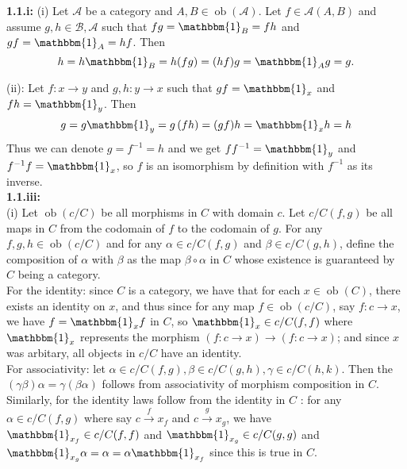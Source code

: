\documentclass[a4paper]{article}
\DeclareMathOperator{\ob}{ob}
\begin{document}
    \textbf{1.1.i:} (i) 
Let $\mathcal{A}$ be a category and $A,B \in \ob(\mathcal{A})$. Let
$f \in \mathcal{A}\left( A,B \right) $ and assume 
$g,h \in \mathcal{B,A}$ such that
$fg = \mathbbm{1}_{B} = fh$ and $gf = \mathbbm{1}_{A} = hf$.
Then
\[
    h = h \mathbbm{1}_{B} = h (fg) = (hf) g = \mathbbm{1}_{A} g = g.
\] 

(ii): Let $f \colon x \to y$ and $g,h  \colon y \to x$ such that
$gf = \mathbbm{1}_{x}$ and $fh = \mathbbm{1}_{y}$. Then
\[
    g = g \mathbbm{1}_{y} = g \left( fh \right) = (gf) h = \mathbbm{1}_{x} h = h
\] 
Thus we can denote $g = f^{-1} = h$ and we get
$f f^{-1} = \mathbbm{1}_{y}$ and $f^{-1}f = \mathbbm{1}_{x}$, so 
$f$ is an isomorphism by definition with $f^{-1}$ as its inverse.\\
\linebreak
\textbf{1.1.iii:}\\
(i) Let $\ob \left( c /C \right) $ be all morphisms in $C$ with domain $c$.
Let $c /C \left( f,g \right) $ be all maps in $C$ from the codomain of  $f$ to
the codomain of $g$. For any $f,g,h \in \ob \left( c /C \right) $ and for any
$\alpha \in  c /C \left( f,g \right) $ and $\beta \in c /C \left( g,h \right)
$,
define the composition of $\alpha$ with $\beta$ as the map
$\beta \circ \alpha$ in $C$ whose existence is  guaranteed by $C$ being
a category.\\
For the identity: since $C$ is a category, we have that for each $x \in \ob(C)$,
there exists an identity on $x$, and thus since
for any map  $f \in \ob(c /C)$, say $f  \colon c \to x$, we have $f
= \mathbbm{1}_{x} f$ in $C$, so  $\mathbbm{1}_{x} \in c /C (f,f)$ where
$\mathbbm{1}_{x}$ represents the morphism $\left( f \colon c \to x \right) \to 
\left( f  \colon c \to x \right) $; and since
$x$ was arbitary, all objects in $c /C$ have an identity.\\
\linebreak
For associativity: let $\alpha \in c /C(f,g), \beta \in c /C (g,h), \gamma \in
c /C (h,k)$. Then the $(\gamma \beta) \alpha = \gamma (\beta \alpha)$ follows
from associativity of morphism composition in $C$.\\
Similarly, for the identity laws follow from the identity in $C$ : for any
$\alpha \in  c /C(f,g)$ where say $c \xrightarrow{f} x_f$ and
$c \xrightarrow{g} x_g$, we have $\mathbbm{1}_{x_f} \in c /C(f,f)$ and $\mathbbm{1}_{x_g}
\in  c /C(g,g)$ and $\mathbbm{1}_{x_g} \alpha = \alpha = \alpha
\mathbbm{1}_{x_f}$ since this is true in $C$.
\end{document}
